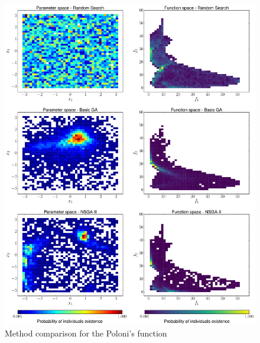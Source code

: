 \newpage

    \begin{figure}[H]
        \centering
        \includegraphics[height=0.96\textheight, width=\textwidth]{Figures/3/hist_POL.pdf}
        \caption{Method comparison for the Poloni's function}
        \label{fig:histogramPOL}
    \end{figure}
    
\newpage

